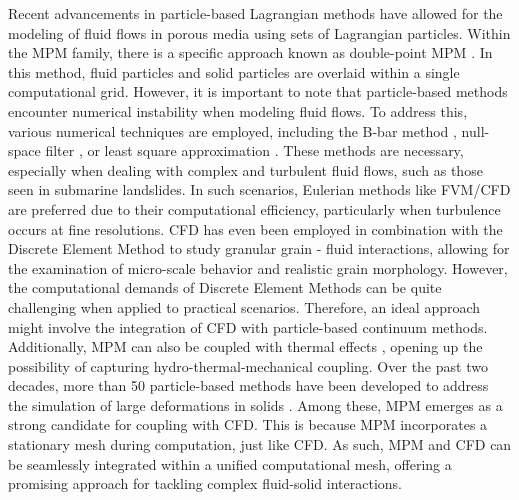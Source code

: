 \documentclass[preprint,12pt]{elsarticle}
\begin{document}
Recent advancements in particle-based Lagrangian methods have allowed for the modeling of fluid flows in porous media using sets of Lagrangian particles. Within the MPM family, there is a specific approach known as double-point MPM \cite{Bandara2015, Tampubolon2017, Baumgarten2019}. In this method, fluid particles and solid particles are overlaid within a single computational grid. However, it is important to note that particle-based methods encounter numerical instability when modeling fluid flows. To address this, various numerical techniques are employed, including the B-bar method \cite{Bandara2015}, null-space filter \cite{nullspace}, or least square approximation \cite{Zheng2021, CPLS}. These methods are necessary, especially when dealing with complex and turbulent fluid flows, such as those seen in submarine landslides. In such scenarios, Eulerian methods like FVM/CFD are preferred due to their computational efficiency, particularly when turbulence occurs at fine resolutions. CFD has even been employed in combination with the Discrete Element Method \cite{JD1, JD2} to study granular grain - fluid interactions, allowing for the examination of micro-scale behavior and realistic grain morphology. However, the computational demands of Discrete Element Methods can be quite challenging when applied to practical scenarios. Therefore, an ideal approach might involve the integration of CFD with particle-based continuum methods. Additionally, MPM can also be coupled with thermal effects \cite{Zhao2, Zhao3, Pinyol1}, opening up the possibility of capturing hydro-thermal-mechanical coupling. Over the past two decades, more than 50 particle-based methods have been developed to address the simulation of large deformations in solids \cite{Chen2017}. Among these, MPM emerges as a strong candidate for coupling with CFD. This is because MPM incorporates a stationary mesh during computation, just like CFD. As such, MPM and CFD can be seamlessly integrated within a unified computational mesh, offering a promising approach for tackling complex fluid-solid interactions.\\
%
%
\end{document}
